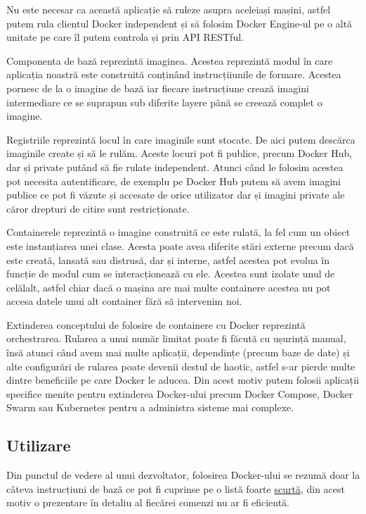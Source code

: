 Nu este necesar ca această aplicație să ruleze asupra aceleiași mașini, astfel putem rula
clientul Docker independent și să folosim Docker Engine-ul pe o altă unitate pe care îl putem 
controla și prin API RESTful.

Componenta de bază reprezintă imaginea. Acestea reprezintă modul în care aplicația noastră
este construită conținând instrucțiiunile de formare. Acestea pornesc de la o imagine de bază 
iar fiecare instrucțiune crează imagini intermediare ce se suprapun sub diferite layere
până se creează complet o imagine.

Registriile reprezintă locul în care imaginile sunt stocate. De aici putem descărca 
imaginile create și să le rulăm. Aceste locuri pot fi publice, precum Docker Hub,
dar și private putând să fie rulate independent. Atunci când le folosim acestea pot 
necesita autentificare, de exemplu pe Docker Hub putem să avem imagini publice 
ce pot fi văzute și accesate de orice utilizator dar și imagini private ale căror 
drepturi de citire sunt restricționate.

Containerele reprezintă o imagine construită ce este rulată, la fel cum un obiect este 
instanțiarea unei clase. Acesta poate avea diferite stări externe precum dacă este creată,
lansată sau distrusă, dar și interne, astfel acestea pot evolua în funcție de modul
cum se interacționează cu ele. Acestea sunt izolate unul de celălalt, astfel chiar dacă
o mașina are mai multe containere acestea nu pot accesa datele unui alt container 
fără să intervenim noi.

Extinderea conceptului de folosire de containere cu Docker reprezintă orchestrarea.
Rularea a unui număr limitat poate fi făcută cu ușurință manual, însă atunci când
avem mai multe aplicații, dependințe (precum baze de date) și alte configurări de rularea 
poate devenii destul de haotic, astfel s-ar pierde multe dintre beneficiile pe care Docker le aducea.
Din acest motiv putem folosii aplicații specifice menite pentru extinderea Docker-ului precum
Docker Compose, Docker Swarm sau Kubernetes pentru a administra sisteme mai complexe.

\subsection{Utilizare}

Din punctul de vedere al unui dezvoltator, folosirea Docker-ului se rezumă
doar la câteva instrucțiuni de bază ce pot fi cuprinse pe o listă foarte 
\href{https://dockerlabs.collabnix.com/docker/cheatsheet/}{scurtă}, din acest 
motiv o prezentare în detaliu al fiecărei comenzi nu ar fi eficientă.

